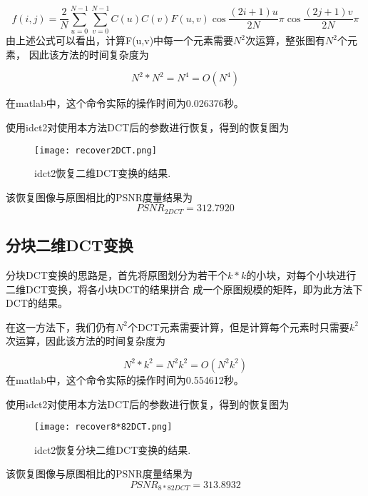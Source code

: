 \documentclass{ctexart}
\begin{document}
\begin{equation}
f(i,j) = {\frac {2} {N}}\sum_{u = 0}^{N - 1}\sum_{v = 0}^{N - 1}C(u)C(v)F(u,v) \cos {\frac{(2i + 1)u} {2N} \pi}\cos {\frac{(2j + 1)v} {2N} \pi}
\end{equation}
由上述公式可以看出，计算F(u,v)中每一个元素需要$N^2$次运算，整张图有$N^2$个元素，
因此该方法的时间复杂度为

\begin{equation}
N^2 * N ^ 2 = N^4 = O(N^4)
\end{equation}

在matlab中，这个命令实际的操作时间为0.026376秒。

使用idct2对使用本方法DCT后的参数进行恢复，得到的恢复图为

\begin{figure}
\centering
\texttt{[image: recover2DCT.png]}
\caption{idct2恢复二维DCT变换的结果.}
\end{figure}

该恢复图像与原图相比的PSNR度量结果为
\begin{equation}
PSNR_{2DCT} = 312.7920
\end{equation}

\subsection{分块二维DCT变换}
分块DCT变换的思路是，首先将原图划分为若干个$k * k$的小块，对每个小块进行二维DCT变换，将各小块DCT的结果拼合
成一个原图规模的矩阵，即为此方法下DCT的结果。

在这一方法下，我们仍有$N^2$个DCT元素需要计算，但是计算每个元素时只需要$k^2$次运算，因此该方法的时间复杂度为

\begin{equation}
N^2 * k ^ 2 = N^2 k ^ 2 = O(N^2k^2)
\end{equation}
在matlab中，这个命令实际的操作时间为0.554612秒。

使用idct2对使用本方法DCT后的参数进行恢复，得到的恢复图为

\begin{figure}
\centering
\texttt{[image: recover8*82DCT.png]}
\caption{idct2恢复分块二维DCT变换的结果.}
\end{figure}

该恢复图像与原图相比的PSNR度量结果为
\begin{equation}
PSNR_{8*8 2DCT} = 313.8932
\end{equation}

\clearpage
\end{document}
